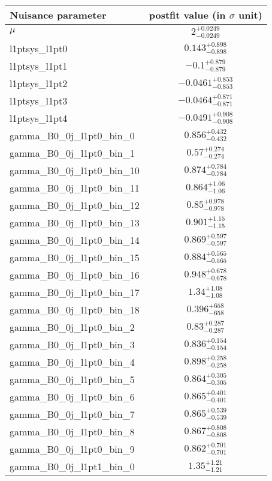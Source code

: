 
\begin{tabular}{|l|c|}
\hline
Nuisance parameter & postfit value (in $\sigma$ unit) \\\hline
$\mu$ & $2^{+0.0249}_{-0.0249}$ \\
l1ptsys\_l1pt0 & $0.143^{+0.898}_{-0.898}$ \\
l1ptsys\_l1pt1 & $-0.1^{+0.879}_{-0.879}$ \\
l1ptsys\_l1pt2 & $-0.0461^{+0.853}_{-0.853}$ \\
l1ptsys\_l1pt3 & $-0.0464^{+0.871}_{-0.871}$ \\
l1ptsys\_l1pt4 & $-0.0491^{+0.908}_{-0.908}$ \\
gamma\_B0\_0j\_l1pt0\_bin\_0 & $0.856^{+0.432}_{-0.432}$ \\
gamma\_B0\_0j\_l1pt0\_bin\_1 & $0.57^{+0.274}_{-0.274}$ \\
gamma\_B0\_0j\_l1pt0\_bin\_10 & $0.874^{+0.784}_{-0.784}$ \\
gamma\_B0\_0j\_l1pt0\_bin\_11 & $0.864^{+1.06}_{-1.06}$ \\
gamma\_B0\_0j\_l1pt0\_bin\_12 & $0.85^{+0.978}_{-0.978}$ \\
gamma\_B0\_0j\_l1pt0\_bin\_13 & $0.901^{+1.15}_{-1.15}$ \\
gamma\_B0\_0j\_l1pt0\_bin\_14 & $0.869^{+0.597}_{-0.597}$ \\
gamma\_B0\_0j\_l1pt0\_bin\_15 & $0.884^{+0.565}_{-0.565}$ \\
gamma\_B0\_0j\_l1pt0\_bin\_16 & $0.948^{+0.678}_{-0.678}$ \\
gamma\_B0\_0j\_l1pt0\_bin\_17 & $1.34^{+1.08}_{-1.08}$ \\
gamma\_B0\_0j\_l1pt0\_bin\_18 & $0.396^{+658}_{-658}$ \\
gamma\_B0\_0j\_l1pt0\_bin\_2 & $0.83^{+0.287}_{-0.287}$ \\
gamma\_B0\_0j\_l1pt0\_bin\_3 & $0.836^{+0.154}_{-0.154}$ \\
gamma\_B0\_0j\_l1pt0\_bin\_4 & $0.898^{+0.258}_{-0.258}$ \\
gamma\_B0\_0j\_l1pt0\_bin\_5 & $0.864^{+0.305}_{-0.305}$ \\
gamma\_B0\_0j\_l1pt0\_bin\_6 & $0.865^{+0.401}_{-0.401}$ \\
gamma\_B0\_0j\_l1pt0\_bin\_7 & $0.865^{+0.539}_{-0.539}$ \\
gamma\_B0\_0j\_l1pt0\_bin\_8 & $0.867^{+0.808}_{-0.808}$ \\
gamma\_B0\_0j\_l1pt0\_bin\_9 & $0.862^{+0.701}_{-0.701}$ \\
gamma\_B0\_0j\_l1pt1\_bin\_0 & $1.35^{+1.21}_{-1.21}$ \\

\end{tabular}
